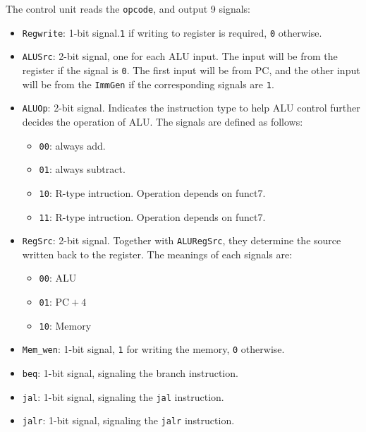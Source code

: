 \documentclass[12pt]{article}
\begin{document}
\indent The control unit reads the \texttt{opcode}, and output 9 signals:
\begin{itemize}
	\item \texttt{Regwrite}: 1-bit signal.\texttt{1} if writing to register is 
		required, \texttt{0} otherwise.

	\item \texttt{ALUSrc}: 2-bit signal, one for each ALU input. The input will
		be from the register if the signal is \texttt{0}. The first input will
		be from PC, and the other input will be from the \texttt{ImmGen} if the
		corresponding signals are \texttt{1}.

	\item \texttt{ALUOp}: 2-bit signal. Indicates the instruction type to help
		ALU control further decides the operation of ALU. The signals are defined
		as follows:
		\begin{itemize}
			\item \texttt{00}: always add.
			\item \texttt{01}: always subtract.
			\item \texttt{10}: R-type intruction. Operation depends on funct7.
			\item \texttt{11}: R-type intruction. Operation depends on funct7.
		\end{itemize}

	\item \texttt{RegSrc}: 2-bit signal. Together with \texttt{ALURegSrc}, they
		determine the source written back to the register. The meanings of each
		signals are:
		\begin{itemize}
			\item \texttt{00}: ALU
			\item \texttt{01}: $\text{PC}+4$
			\item \texttt{10}: Memory
		\end{itemize}

	\item \texttt{Mem\_wen}: 1-bit signal, \texttt{1} for writing the memory,
		\texttt{0} otherwise.

	\item \texttt{beq}: 1-bit signal, signaling the branch instruction.
	\item \texttt{jal}: 1-bit signal, signaling the \texttt{jal} instruction.
	\item \texttt{jalr}: 1-bit signal, signaling the \texttt{jalr} instruction.

\end{itemize}
\end{document}
